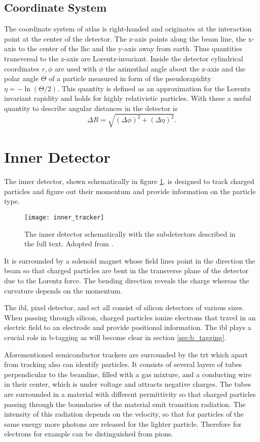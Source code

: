 \subsection*{Coordinate System}
The coordinate system of \ac{atlas} is right-handed and originates at the interaction point at the center of the detector. The z-axis points along the beam line, the x-axis to the center of the lhc and the y-axis away from earth. Thus quantities transversal to the z-axis are Lorentz-invariant. Inside the detector cylindrical coordinates $r,\phi$ are used with $\phi$ the azimuthal angle about the z-axis and the polar angle $\Theta$ of a particle measured in form of the pseudorapidity $\eta=-\ln(\Theta/2)$. This quantity is defined as an approximation for the Lorentz invariant rapidity and holds for highly relativistic particles. With these a useful quantity to describe angular distances in the detector is
\begin{equation}
    \Delta R = \sqrt{(\Delta\phi)^2+(\Delta \eta)^2}.
    \label{eq:delta_R}
\end{equation}

\section{Inner Detector}\label{sec:inner_detector}
The inner detector, shown schematically in figure \ref{fig:inner_tracker}, is designed to track charged particles and figure out their momentum and provide information on the particle type.
\begin{figure}
    \centering
    \texttt{[image: inner\_tracker]}
    \caption[]{The inner detector schematically with the subdetectors described in the full text. Adopted from \citep{Potamianos:2016ptf}.}
    \label{fig:inner_tracker}
\end{figure}
It is surrounded by a solenoid magnet whose field lines point in the direction the beam so that charged particles are bent in the transverse plane of the detector due to the Lorentz force. The bending direction reveals the charge whereas the curvature depends on the momentum.

The \ac{ibl}, pixel detector, and \ac{sct} all consist of silicon detectors of various sizes. When passing through silicon, charged particles ionize electrons that travel in an electric field to an electrode and provide positional information. The \ac{ibl} plays a crucial role in b-tagging as will become clear in section \ref{sec:b_tagging}.

Aforementioned semiconductor trackers are surrounded by the \ac{trt} which apart from tracking also can identify particles. It consists of several layers of tubes perpendicular to the beamline, filled with a gas mixture, and a conducting wire in their center, which is under voltage and attracts negative charges. The tubes are surrounded in a material with different permittivity so that charged particles passing through the boundaries of the material emit transition radiation. The intensity of this radiation depends on the velocity, so that for particles of the same energy more photons are released for the lighter particle. Therefore for electrons for example can be distinguished from pions.

